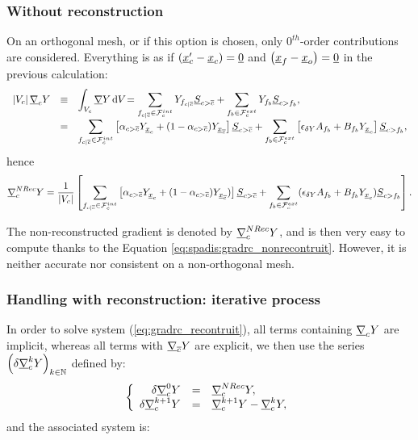 \subsubsection{Without reconstruction}
On an orthogonal mesh, or if this option is chosen, only $0^{th}$-order contributions are considered.
Everything is as if
$\left(\underline{x}_{c}^\prime - {\underline{x}_{c}}\right) = \underline{0}$ and $\left(\underline{x}_{{f}} - \underline{x}_o\right) = \underline{0}$ in the previous calculation:
\begin{equation}\notag
\begin{array}{r c l}
\left| V_{c} \right| \underline{\nabla}_c Y &\equiv & \displaystyle
\int_{V_{c}} \underline{\nabla} Y\, \mathrm{d} V_{} =\sum\limits_{{{f}_{c|{\overline{c}}}} \in \mathcal{F}^{int}_{c}} Y_{{{f}_{c|{\overline{c}}}}} \underline{S}_{{c > {\overline{c}}}} + \sum\limits_{{{f}_{b}} \in \mathcal{F}^{ext}_{c}} Y_{{{f}_{b}}} \underline{S}_{{c>{{f}_{b}}}}, \\
 &=& \displaystyle
 \sum\limits_{ {{f}_{c|{\overline{c}}}} \in \mathcal{F}^{int}_{c}}
 \left[ \alpha_{{c > {\overline{c}}}} Y_{{\underline{x}_{c}}} +
(1 - \alpha_{{c > {\overline{c}}}}) Y_{\underline{x}_{{\overline{c}}}} \right] \underline{S}_{{c > {\overline{c}}}}
+ \sum\limits_{ {{f}_{b}} \in \mathcal{F}^{ext}_{c}} \left[ \epsilon_{\delta Y} A_{{{f}_{b}}} + B_{{{f}_{b}}}Y_{{\underline{x}_{c}}} \right] \underline{S}_{{c>{{f}_{b}}}},
\end{array}
\end{equation}
hence
\begin{equation}\label{eq:spadis:gradrc_nonrecontruit}
\underline{\nabla}_c^{NRec} Y= \dfrac{1}{\left| V_{c} \right|} \left[
  \sum\limits_{{{f}_{c|{\overline{c}}}} \in \mathcal{F}^{int}_{c}} \left[\alpha_{{c > {\overline{c}}}} Y_{{\underline{x}_{c}}} + (1 - \alpha_{{c > {\overline{c}}}}) Y_{\underline{x}_{{\overline{c}}}}) \right] \underline{S}_{{c > {\overline{c}}}}
+\sum\limits_{{{f}_{b}} \in \mathcal{F}^{ext}_{c}}(\epsilon_{\delta Y} A_{{{f}_{b}}} + B_{{{f}_{b}}} Y_{{\underline{x}_{c}}}
) \underline{S}_{{c>{{f}_{b}}}} \right].
\end{equation}

\begin{remark}
The non-reconstructed gradient is denoted by $ \underline{\nabla}_{c}^{NRec} Y  $, and is then
very easy to compute thanks to the Equation \eqref{eq:spadis:gradrc_nonrecontruit}.
However, it is neither accurate nor consistent on a non-orthogonal mesh.
\end{remark}

\subsubsection{Handling with reconstruction: iterative process}

In order to solve system (\ref{eq:gradrc_recontruit}), all terms containing $\underline{\nabla}_{c} Y$ are implicit, whereas
all terms with $\underline{\nabla}_{{\overline{c}}} Y$ are explicit, we then use the series $\left( \delta \underline{\nabla}_{c}^k Y \right)_{k \in \mathbb{N}}$ defined by:
%
\begin{equation}
\left\{\begin{array}{r c l}
\delta \underline{\nabla}_{c}^0 Y &=& \underline{\nabla}_{c}^{NRec} Y, \\
\delta \underline{\nabla}_{c}^{k+1} Y &= &\underline{\nabla}_{c}^{k+1} Y - \underline{\nabla}_{c}^k Y ,
\end{array}\right.
\end{equation}
%
and the associated system is:

